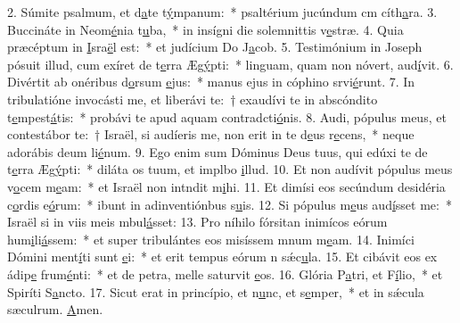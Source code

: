 2. Súmite psalmum, et d\uline{a}te t\uline{ý}mpanum:~* psaltérium jucúndum cm cíth\uline{a}ra.
3. Buccináte in Neom\uline{é}nia t\uline{u}ba,~* in insígni die solemnittis v\uline{e}stræ.
4. Quia præcéptum in \uline{I}sra\uline{ë}l est:~* et judícium Do J\uline{a}cob.
5. Testimónium in Joseph pósuit illud, cum exíret de t\uline{e}rra Æg\uline{ý}pti:~* linguam, quam non nóvert, aud\uline{í}vit.
6. Divértit ab onéribus d\uline{o}rsum \uline{e}jus:~* manus ejus in cóphino srvi\uline{é}runt.
7. In tribulatióne invocásti me, et liberávi te:~† exaudívi te in abscóndito t\uline{e}mpest\uline{á}tis:~* probávi te apud aquam contradcti\uline{ó}nis.
8. Audi, pópulus meus, et contestábor te:~† Israël, si audíeris me, non erit in te d\uline{e}us r\uline{e}cens,~* neque adorábis deum li\uline{é}num.
9. Ego enim sum Dóminus Deus tuus, qui edúxi te de t\uline{e}rra Æg\uline{ý}pti:~* diláta os tuum, et implbo \uline{i}llud.
10. Et non audívit pópulus meus v\uline{o}cem m\uline{e}am:~* et Israël non intndit m\uline{i}hi.
11. Et dimísi eos secúndum desidéria c\uline{o}rdis e\uline{ó}rum:~* ibunt in adinventiónbus s\uline{u}is.
12. Si pópulus m\uline{e}us aud\uline{í}sset me:~* Israël si in viis meis mbul\uline{á}sset:
13. Pro níhilo fórsitan inimícos eórum hum\uline{i}li\uline{á}ssem:~* et super tribulántes eos misíssem mnum m\uline{e}am.
14. Inimíci Dómini ment\uline{í}ti sunt \uline{e}i:~* et erit tempus eórum n sǽc\uline{u}la.
15. Et cibávit eos ex ádip\uline{e} frum\uline{é}nti:~* et de petra, melle saturvit \uline{e}os.
16. Glória P\uline{a}tri, et F\uline{í}lio,~* et Spiríti S\uline{a}ncto.
17. Sicut erat in princípio, et n\uline{u}nc, et s\uline{e}mper,~* et in sǽcula sæculrum. \uline{A}men.
